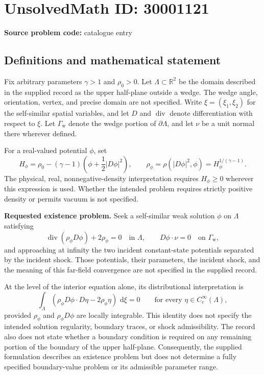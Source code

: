 \documentclass[11pt]{article}
\newcommand{\R}{\mathbb{R}}
\newcommand{\dd}{\,\mathrm{d}}
\begin{document}
\section*{UnsolvedMath ID: 30001121}
\textbf{Source problem code:} catalogue entry
\subsection{Definitions and mathematical statement}
Fix arbitrary parameters \(\gamma>1\) and \(\rho_0>0\). Let \(\Lambda\subset\R^2\) be the domain described in the supplied record as the upper half-plane outside a wedge. The wedge angle, orientation, vertex, and precise domain are not specified. Write \(\xi=(\xi_1,\xi_2)\) for the self-similar spatial variables, and let \(D\) and \(\operatorname{div}\) denote differentiation with respect to \(\xi\). Let \(\Gamma_{\mathrm w}\) denote the wedge portion of \(\partial\Lambda\), and let \(\nu\) be a unit normal there wherever defined.

For a real-valued potential \(\phi\), set
\[
H_\phi=\rho_0-(\gamma-1)\left(\phi+\frac12|D\phi|^2\right),
\qquad
\rho_\phi=\rho(|D\phi|^2,\phi)=H_\phi^{1/(\gamma-1)}.
\]
The physical, real, nonnegative-density interpretation requires \(H_\phi\geq0\) wherever this expression is used. Whether the intended problem requires strictly positive density or permits vacuum is not specified.

\textbf{Requested existence problem.} Seek a self-similar weak solution \(\phi\) on \(\Lambda\) satisfying
\[
\operatorname{div}(\rho_\phi D\phi)+2\rho_\phi=0
\quad\text{in }\Lambda,
\qquad
D\phi\cdot\nu=0
\quad\text{on }\Gamma_{\mathrm w},
\]
and approaching at infinity the two incident constant-state potentials separated by the incident shock. Those potentials, their parameters, the incident shock, and the meaning of this far-field convergence are not specified in the supplied record.

At the level of the interior equation alone, its distributional interpretation is
\[
\int_\Lambda\left(\rho_\phi D\phi\cdot D\eta-2\rho_\phi\eta\right)\,\dd\xi=0
\qquad\text{for every }\eta\in C_c^\infty(\Lambda),
\]
provided \(\rho_\phi\) and \(\rho_\phi D\phi\) are locally integrable. This identity does not specify the intended solution regularity, boundary traces, or shock admissibility. The record also does not state whether a boundary condition is required on any remaining portion of the boundary of the upper half-plane. Consequently, the supplied formulation describes an existence problem but does not determine a fully specified boundary-value problem or its admissible parameter range.
\end{document}
